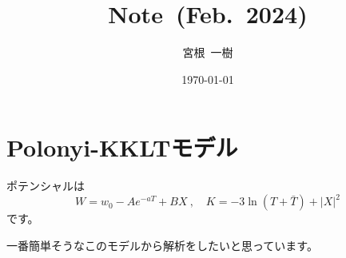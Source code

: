 \documentclass[a4paper,uplatex,dvipdfmx,10pt]{jsarticle}
\title{
  Note\ (Feb.\ 2024)
}
\author{
  宮根\ 一樹
}
\date{\today}
\theoremstyle{definition}
\begin{document}
\maketitle
\tableofcontents

\clearpage
\section{Polonyi-KKLTモデル}

ポテンシャルは
\begin{equation}
  W
  =
  w_{0}
  -
  Ae^{-aT}
  +
  BX
  \ ,\quad
  K
  =
  -3\ln(T+\bar{T})
  +
  |X|^2
\end{equation}
です。

一番簡単そうなこのモデルから解析をしたいと思っています。
\end{document}

